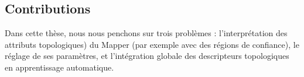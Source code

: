 
\subsection{Contributions}




Dans cette th\`ese, nous nous penchons sur trois probl\`emes : 
l'interpr\'etation des attributs topologiques) du Mapper (par exemple avec des r\'egions de confiance), le r\'eglage de ses param\`etres, et
l'int\'egration globale des descripteurs topologiques en apprentissage automatique. 


